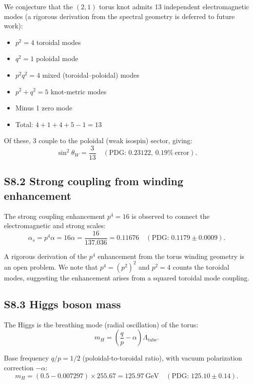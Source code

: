 \documentclass[11pt,a4paper]{article}
\begin{document}
We conjecture that the $(2,1)$ torus knot admits 13 independent electromagnetic modes (a rigorous derivation from the spectral geometry is deferred to future work):
\begin{itemize}
  \item $p^2 = 4$ toroidal modes
  \item $q^2 = 1$ poloidal mode
  \item $p^2 q^2 = 4$ mixed (toroidal--poloidal) modes
  \item $p^2 + q^2 = 5$ knot-metric modes
  \item Minus 1 zero mode
  \item Total: $4 + 1 + 4 + 5 - 1 = 13$
\end{itemize}

Of these, 3 couple to the poloidal (weak isospin) sector, giving:
\begin{equation}
  \sin^2\theta_W = \frac{3}{13} \quad (\text{PDG: } 0.23122,\ 0.19\%\ \text{error}).
\end{equation}

\subsection{S8.2 Strong coupling from winding enhancement}

The strong coupling enhancement $p^4 = 16$ is observed to connect the electromagnetic and strong scales:
\begin{equation}
  \alpha_s = p^4 \alpha = 16\alpha = \frac{16}{137.036} = 0.11676 \quad (\text{PDG: } 0.1179 \pm 0.0009).
\end{equation}

A rigorous derivation of the $p^4$ enhancement from the torus winding geometry is an open problem. We note that $p^4 = (p^2)^2$ and $p^2 = 4$ counts the toroidal modes, suggesting the enhancement arises from a squared toroidal mode coupling.

\subsection{S8.3 Higgs boson mass}

The Higgs is the breathing mode (radial oscillation) of the torus:
\begin{equation}
  m_H = \left(\frac{q}{p} - \alpha\right)\Lambda_{\text{tube}}.
\end{equation}

Base frequency $q/p = 1/2$ (poloidal-to-toroidal ratio), with vacuum polarization correction $-\alpha$:
\begin{equation}
  m_H = (0.5 - 0.007297)\times 255.67 = 125.97~\text{GeV} \quad (\text{PDG: } 125.10 \pm 0.14).
\end{equation}
\end{document}
